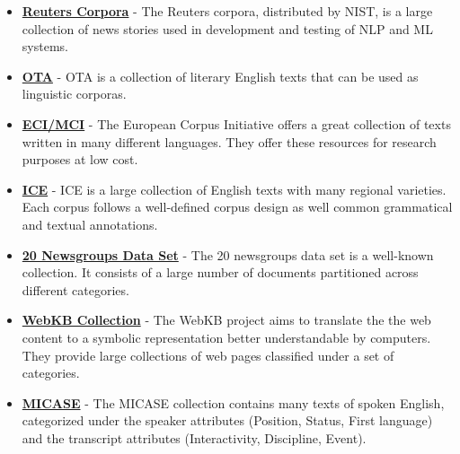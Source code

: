 \begin{itemize}
    \item \textbf{\href{http://trec.nist.gov/data/reuters/reuters.html}{Reuters Corpora}} - The Reuters corpora, distributed by NIST, is a large collection of news stories used in development and testing of NLP and ML systems.
    \item \textbf{\href{http://ota.ox.ac.uk/catalogue/index.html}{OTA}} - OTA is a collection of literary English texts that can be used as linguistic corporas.
    \item \textbf{\href{http://www.elsnet.org/resources/eciCorpus.html}{ECI/MCI}} - The European Corpus Initiative offers a great collection of texts written in many different languages. They offer these resources for research purposes at low cost.
    \item \textbf{\href{http://www.elsnet.org/resources/eciCorpus.html}{ICE}} - ICE  is a large collection of English texts with many regional varieties. Each corpus follows a well-defined corpus design as well common grammatical and textual annotations.
    \item \textbf{\href{http://qwone.com/~jason/20Newsgroups}{20 Newsgroups Data Set}} - The 20 newsgroups data set is a well-known collection. It consists of a large number of documents partitioned across different categories.
    \item \textbf{\href{http://www.cs.cmu.edu/~webkb}{WebKB Collection}} - The WebKB project aims to translate the the web content to a symbolic representation better understandable by computers. They provide large collections of web pages classified under a set of categories. 
    \item \textbf{\href{http://quod.lib.umich.edu/m/micase/}{MICASE}} - The MICASE collection contains many texts of spoken English, categorized under the speaker attributes (Position, Status, First language) and the transcript attributes (Interactivity, Discipline, Event).

\end{itemize}
